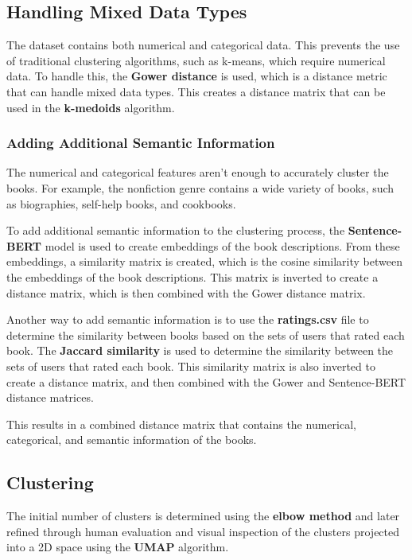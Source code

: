 \documentclass[english]{mvi-report}
\begin{document}
\subsection{Handling Mixed Data Types}
The dataset contains both numerical and categorical data. This prevents the use of traditional clustering algorithms, such as k-means, which require numerical data. To handle this, the \textbf{Gower distance} \cite{tuerhong2014gower} is used, which is a distance metric that can handle mixed data types. This creates a distance matrix that can be used in the \textbf{k-medoids} \cite{park2009simple} algorithm.

\subsubsection{Adding Additional Semantic Information}
The numerical and categorical features aren't enough to accurately cluster the books. For example, the nonfiction genre contains a wide variety of books, such as biographies, self-help books, and cookbooks.

To add additional semantic information to the clustering process, the \textbf{Sentence-BERT} \cite{reimers2019sentence} model is used to create embeddings of the book descriptions. From these embeddings, a similarity matrix is created, which is the cosine similarity between the embeddings of the book descriptions. This matrix is inverted to create a distance matrix, which is then combined with the Gower distance matrix.

Another way to add semantic information is to use the \textbf{ratings.csv} file to determine the similarity between books based on the sets of users that rated each book. The \textbf{Jaccard similarity} is used to determine the similarity between the sets of users that rated each book. This similarity matrix is also inverted to create a distance matrix, and then combined with the Gower and Sentence-BERT distance matrices.

This results in a combined distance matrix that contains the numerical, categorical, and semantic information of the books.

\newpage
\subsection{Clustering}

The initial number of clusters is determined using the \textbf{elbow method} and later refined through human evaluation and visual inspection of the clusters projected into a 2D space using the \textbf{UMAP} algorithm.
\end{document}
